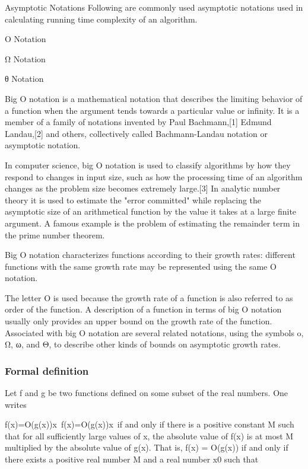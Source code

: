 \begin{frame}
Asymptotic Notations
Following are commonly used asymptotic notations used in calculating running time complexity of an algorithm.

Ο Notation

Ω Notation

θ Notation
\end{frame}
\begin{frame}
Big O notation is a mathematical notation that describes the limiting behavior of a function when the argument tends towards a particular value or infinity. It is a member of a family of notations invented by Paul Bachmann,[1] Edmund Landau,[2] and others, collectively called Bachmann-Landau notation or asymptotic notation.
\end{frame}
\begin{frame}
In computer science, big O notation is used to classify algorithms by how they respond to changes in input size, such as how the processing time of an algorithm changes as the problem size becomes extremely large.[3] In analytic number theory it is used to estimate the "error committed" while replacing the asymptotic size of an arithmetical function by the value it takes at a large finite argument. A famous example is the problem of estimating the remainder term in the prime number theorem.
\end{frame}
\begin{frame}

Big O notation characterizes functions according to their growth rates: different functions with the same growth rate may be represented using the same O notation.

The letter O is used because the growth rate of a function is also referred to as order of the function. A description of a function in terms of big O notation usually only provides an upper bound on the growth rate of the function. Associated with big O notation are several related notations, using the symbols o, Ω, ω, and Θ, to describe other kinds of bounds on asymptotic growth rates.
\end{frame}
\begin{frame}
\frametitle{Formal definition}
Let f and g be two functions defined on some subset of the real numbers. One writes

{\displaystyle f(x)=O(g(x)){}x\to \infty \,} f(x)=O(g(x)){}x\to \infty \,
if and only if there is a positive constant M such that for all sufficiently large values of x, the absolute value of f(x) is at most M multiplied by the absolute value of g(x). That is, f(x) = O(g(x)) if and only if there exists a positive real number M and a real number x0 such that
\end{frame}
